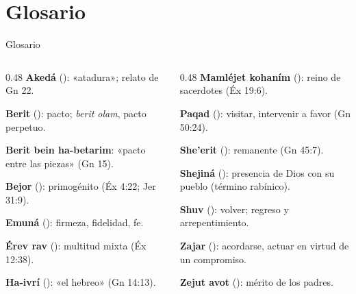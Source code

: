 \section{Glosario}
\begin{frame}{Glosario}
\begin{columns}[T,onlytextwidth]
\begin{column}{0.48\textwidth}\footnotesize
\textbf{Akedá} (): «atadura»; relato de Gn 22.\par\smallskip
\textbf{Berit} (): pacto; \emph{berit olam}, pacto perpetuo.\par\smallskip
\textbf{Berit bein ha-betarim}: «pacto entre las piezas» (Gn 15).\par\smallskip
\textbf{Bejor} (): primogénito (Éx 4:22; Jer 31:9).\par\smallskip
\textbf{Emuná} (): firmeza, fidelidad, fe.\par\smallskip
\textbf{Érev rav} (): multitud mixta (Éx 12:38).\par\smallskip
\textbf{Ha-ivrí} (): «el hebreo» (Gn 14:13).
\end{column}
\begin{column}{0.48\textwidth}\footnotesize
\textbf{Mamléjet kohaním} (): reino de sacerdotes (Éx 19:6).\par\smallskip
\textbf{Paqad} (): visitar, intervenir a favor (Gn 50:24).\par\smallskip
\textbf{She'erit} (): remanente (Gn 45:7).\par\smallskip
\textbf{Shejiná} (): presencia de Dios con su pueblo (término rabínico).\par\smallskip
\textbf{Shuv} (): volver; regreso y arrepentimiento.\par\smallskip
\textbf{Zajar} (): acordarse, actuar en virtud de un compromiso.\par\smallskip
\textbf{Zejut avot} (): mérito de los padres.
\end{column}
\end{columns}
\end{frame}

